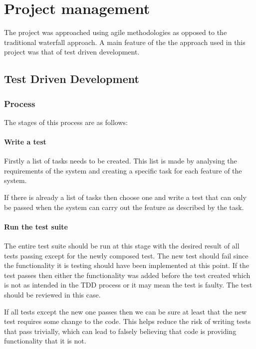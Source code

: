 \chapter{Project management}
The project was approached using agile methodologies as opposed to the traditional waterfall approach. A main feature of the the approach used in this project was that of test driven development. 

\section{Test Driven Development}

\subsection{Process}

The stages of this process are as follows:
	
\subsubsection*{Write a test}

Firstly a list of tasks needs to be created. This list is made by analysing the requirements of the system and creating a specific task for each feature of the system. 

If there is already a list of tasks then choose one and write a test that can only be passed when the system can carry out the feature as described by the task.


\subsubsection*{Run the test suite}

The entire test suite should be run at this stage with the desired result of all tests passing except for the newly composed test. The new test should fail since the functionality it is testing should have been implemented at this point. If the test passes then either the functionality was added before the test created which is not as intended in the TDD process or it may mean the test is faulty. The test should be reviewed in this case.

If all tests except the new one passes then we can be sure at least that the new test requires some change to the code. This helps reduce the risk of writing tests that pass trivially, which can lead to falsely believing that code is providing functionality that it is not.

